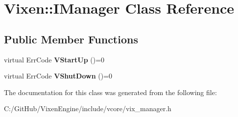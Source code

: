 \hypertarget{class_vixen_1_1_i_manager}{}\section{Vixen\+:\+:I\+Manager Class Reference}
\label{class_vixen_1_1_i_manager}
\subsection*{Public Member Functions}
\begin{DoxyCompactItemize}
\item 
\hypertarget{class_vixen_1_1_i_manager_add13ce871c8135673cdf607ae87ea356}{}virtual Err\+Code {\bfseries V\+Start\+Up} ()=0\label{class_vixen_1_1_i_manager_add13ce871c8135673cdf607ae87ea356}

\item 
\hypertarget{class_vixen_1_1_i_manager_a29fb4312c10a2a9e41ef455ea8d1cd6e}{}virtual Err\+Code {\bfseries V\+Shut\+Down} ()=0\label{class_vixen_1_1_i_manager_a29fb4312c10a2a9e41ef455ea8d1cd6e}

\end{DoxyCompactItemize}


The documentation for this class was generated from the following file\+:\begin{DoxyCompactItemize}
\item 
C\+:/\+Git\+Hub/\+Vixen\+Engine/include/vcore/vix\+\_\+manager.\+h\end{DoxyCompactItemize}

